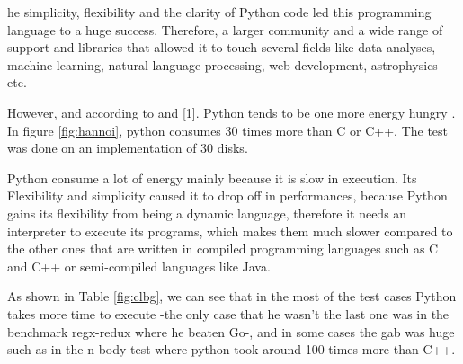 

he simplicity, flexibility and the clarity of Python code led this programming language to a huge success. Therefore, a larger community and a wide range of support and libraries that allowed it to touch several fields like data analyses, machine learning, natural language processing, web development, astrophysics etc.

However, and according to \cite{pinto_energy_2017,noureddine_preliminary_2012} and [1]. Python tends to be one more energy hungry . In figure \ref{fig:hannoi}, python consumes 30 times more than C or C++. The test was done on an implementation of   30 disks.

Python consume a lot of energy mainly because it is slow in execution. Its Flexibility and simplicity caused it to drop off in performances, because Python gains its flexibility from being a dynamic language, therefore it needs an interpreter to execute its programs, which makes them much slower compared to the other ones that are written in compiled programming languages such as C and C++ or semi-compiled languages like Java.

As shown in Table \ref{fig:clbg}, we can see that in the most of the test cases Python takes more time to execute -the only case that he wasn't the last one was in the benchmark regx-redux where he beaten Go-, and in some cases the gab was huge such as in the n-body test where python took around 100 times more than C++.

